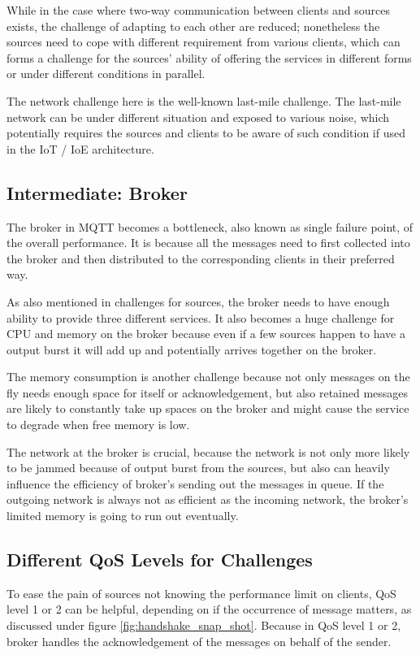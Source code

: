 \documentclass[12pt, letterpaper]{article}
\begin{document}
While in the case where two-way communication between clients and sources exists, the challenge of adapting to each other are reduced; nonetheless the sources need to cope with different requirement from various clients, which can forms a challenge for the sources' ability of offering the services in different forms or under different conditions in parallel.

The network challenge here is the well-known last-mile challenge. The last-mile network can be under different situation and exposed to various noise, which potentially requires the sources and clients to be aware of such condition if used in the IoT / IoE architecture.

\subsection{Intermediate: Broker}

The broker in MQTT becomes a bottleneck, also known as single failure point, of the overall performance. It is because all the messages need to first collected into the broker and then distributed to the corresponding clients in their preferred way.

As also mentioned in challenges for sources, the broker needs to have enough ability to provide three different services. It also becomes a huge challenge for CPU and memory on the broker because even if a few sources happen to have a output burst it will add up and potentially arrives together on the broker. 

The memory consumption is another challenge because not only messages on the fly needs enough space for itself or acknowledgement, but also retained messages are likely to constantly take up spaces on the broker and might cause the service to degrade when free memory is low.

The network at the broker is crucial, because the network is not only more likely to be jammed because of output burst from the sources, but also can heavily influence the efficiency of broker's sending out the messages in queue. If the outgoing network is always not as efficient as the incoming network, the broker's limited memory is going to run out eventually.

\subsection{Different QoS Levels for Challenges}

To ease the pain of sources not knowing the performance limit on clients, QoS level 1 or 2 can be helpful, depending on if the occurrence of message matters, as discussed under figure \ref{fig:handshake_snap_shot}. Because in QoS level 1 or 2, broker handles the acknowledgement of the messages on behalf of the sender.
\end{document}
